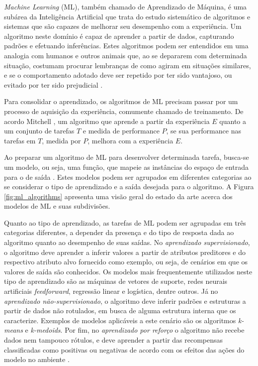 
\emph{Machine Learning} (ML), também chamado de Aprendizado de Máquina, é uma subárea da Inteligência Artificial que trata do estudo sistemático de algoritmos e sistemas que são capazes de melhorar seu desempenho com a experiência. Um algoritmo neste domínio é capaz de aprender a partir de dados, capturando padrões e efetuando inferências. Estes algoritmos podem ser entendidos em uma analogia com  humanos e outros animais que, ao se depararem com determinada situação, costumam procurar lembranças de como agiram em situações similares, e se o comportamento adotado deve ser repetido por ter sido vantajoso, ou evitado por ter sido prejudicial \cite{marsland2015machine,goodfellow2016deep,flach2012machine}.

Para consolidar o aprendizado, os algoritmos de ML precisam passar por um processo de aquisição da experiência, comumente chamado de treinamento. De acordo Mitchell \cite{mitchell1997machine}, um algoritmo que aprende a partir da experiência $E$ quanto a um conjunto de tarefas $T$ e medida de performance $P$, se sua performance nas tarefas em $T$, medida por $P$, melhora com a experiência $E$.

Ao preparar um algoritmo de ML para desenvolver determinada tarefa, busca-se um modelo, ou seja, uma função, que mapeie as instâncias do espaço de entrada para o de saída \cite{flach2012machine}. Estes modelos podem ser agrupados em diferentes categorias ao se considerar o tipo de aprendizado e a saída desejada para o algoritmo. A Figura \ref{fig:ml_algorithms} apresenta uma visão geral do estado da arte acerca dos modelos de ML e suas subdivisões.

Quanto ao tipo de aprendizado, as tarefas de ML podem ser agrupadas em três categorias diferentes, a depender da presença e do tipo de resposta dada ao algoritmo quanto ao desempenho de suas saídas. No \emph{aprendizado supervisionado}, o algoritmo deve aprender a inferir valores a partir de atributos preditores e do respectivo atributo alvo fornecido como exemplo, ou seja, de cenários em que os valores de saída são conhecidos. Os modelos mais frequentemente utilizados neste tipo de aprendizado são as máquinas de vetores de suporte, redes neurais artificiais \emph{feedforward}, regressão linear e logística, dentre outros. Já no \emph{aprendizado não-supervisionado}, o algoritmo deve inferir padrões e estruturas a partir de dados não rotulados, em busca de alguma estrutura interna que os caracterize. Exemplos de modelos aplicáveis a este cenário são os algoritmos \emph{k-means} e \emph{k-medoids}.  Por fim, no \emph{aprendizado por reforço} o algoritmo não recebe dados nem tampouco rótulos, e deve aprender a partir das recompensas classificadas como positivas ou negativas de acordo com os efeitos das ações do modelo no ambiente \cite{flach2012machine}.

